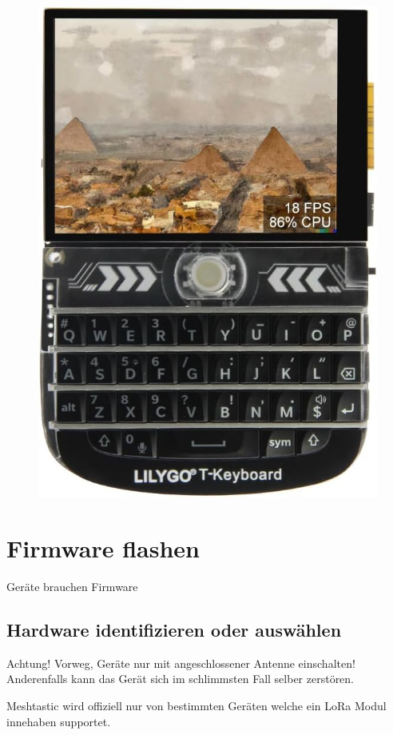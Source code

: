 \documentclass[12pt,a4paper]{article}
\begin{document}
\begin{figure}
	\includegraphics[scale=0.1]{t-deck.jpg}
\end{figure}

\section{Firmware flashen}
Geräte brauchen Firmware

\subsection{Hardware identifizieren oder auswählen}
Achtung!
Vorweg, Geräte nur mit angeschlossener Antenne einschalten! Anderenfalls kann das Gerät sich im schlimmsten Fall selber zerstören.

Meshtastic wird offiziell nur von bestimmten Geräten welche ein LoRa Modul innehaben supportet.
\end{document}
